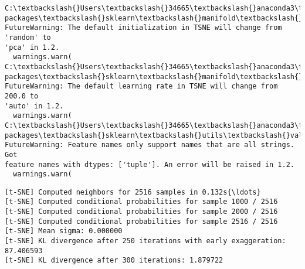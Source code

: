 \documentclass[11pt]{article}
\begin{document}
    \begin{Verbatim}[commandchars=\\\{\}]
C:\textbackslash{}Users\textbackslash{}34665\textbackslash{}anaconda3\textbackslash{}lib\textbackslash{}site-packages\textbackslash{}sklearn\textbackslash{}manifold\textbackslash{}\_t\_sne.py:780:
FutureWarning: The default initialization in TSNE will change from 'random' to
'pca' in 1.2.
  warnings.warn(
C:\textbackslash{}Users\textbackslash{}34665\textbackslash{}anaconda3\textbackslash{}lib\textbackslash{}site-packages\textbackslash{}sklearn\textbackslash{}manifold\textbackslash{}\_t\_sne.py:790:
FutureWarning: The default learning rate in TSNE will change from 200.0 to
'auto' in 1.2.
  warnings.warn(
C:\textbackslash{}Users\textbackslash{}34665\textbackslash{}anaconda3\textbackslash{}lib\textbackslash{}site-packages\textbackslash{}sklearn\textbackslash{}utils\textbackslash{}validation.py:1688:
FutureWarning: Feature names only support names that are all strings. Got
feature names with dtypes: ['tuple']. An error will be raised in 1.2.
  warnings.warn(
    \end{Verbatim}

    \begin{Verbatim}[commandchars=\\\{\}]
[t-SNE] Computed neighbors for 2516 samples in 0.132s{\ldots}
[t-SNE] Computed conditional probabilities for sample 1000 / 2516
[t-SNE] Computed conditional probabilities for sample 2000 / 2516
[t-SNE] Computed conditional probabilities for sample 2516 / 2516
[t-SNE] Mean sigma: 0.000000
[t-SNE] KL divergence after 250 iterations with early exaggeration: 87.406593
[t-SNE] KL divergence after 300 iterations: 1.879722
    \end{Verbatim}

    \begin{center}
    \end{center}
    { \hspace*{\fill} \\}
    
\end{document}
